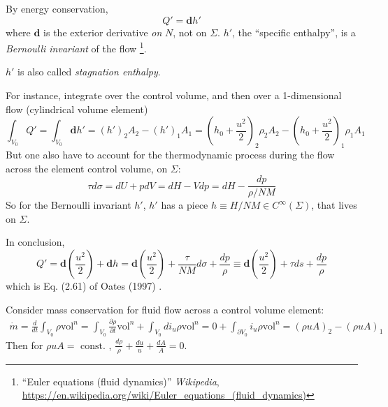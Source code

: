 \documentclass[10pt]{amsart}
\begin{document}
\begin{multicols*}{2}
By energy conservation, 
\[
Q' = \mathbf{d}h'
\]
 where $\mathbf{d}$ is the exterior derivative \emph{on} $N$, not on $\Sigma$.  $h'$, the ``specific enthalpy'', is a \emph{Bernoulli invariant} of the flow \footnote{``Euler equations (fluid dynamics)'' \emph{Wikipedia}, \url{https://en.wikipedia.org/wiki/Euler_equations_(fluid_dynamics)}}.  

$h'$ is also called \emph{stagnation enthalpy}.  

For instance, integrate over the control volume, and then over a 1-dimensional flow (cylindrical volume element)
\[
\int_{V_0} Q' = \int_{V_0} \mathbf{d}h' = (h')_2 A_2 - (h')_1A_1 = (h_0+\frac{u^2}{2})_2 \rho_2 A_2 - (h_0 + \frac{u^2}{2})_1 \rho_1 A_1
\]
But one also have to account for the thermodynamic process during the flow across the element control volume, on $\Sigma$:
\[
\tau d\sigma = dU + pdV = dH - Vdp = dH - \frac{dp}{\rho/NM}
\]
So for the Bernoulli invariant $h'$, $h'$ has a piece $h \equiv H/NM \in C^{\infty}(\Sigma)$, that lives on $\Sigma$.  

In conclusion,
\begin{equation}\label{Eq:flowwithQ}
Q' = \mathbf{d}\left( \frac{u^2}{2} \right) + \mathbf{d}h = \mathbf{d}\left( \frac{u^2}{2} \right) + \frac{\tau}{NM} d\sigma + \frac{dp}{\rho} \equiv \mathbf{d}\left( \frac{u^2}{2} \right) + \tau ds + \frac{dp}{\rho}
\end{equation}
which is Eq. (2.61) of Oates (1997) \cite{GOates1997}.  

Consider mass conservation for fluid flow across a control volume element:
\[
\begin{gathered}
  \dot{m} = \frac{d}{dt} \int_{V_0} \rho \text{vol}^n = \int_{V_0} \frac{ \partial \rho}{ \partial t} \text{vol}^n + \int_{V_0} di_u \rho \text{vol}^n = 0 + \int_{ \partial V_0} i_u \rho \text{vol}^n = (\rho u A)_2 - (\rho u A)_1
\end{gathered}
\]
Then for $\rho u A = \text{ const. }$, $\frac{d\rho}{\rho} + \frac{du}{u} + \frac{dA}{A}=0$.  


\end{multicols*}
\end{document}
